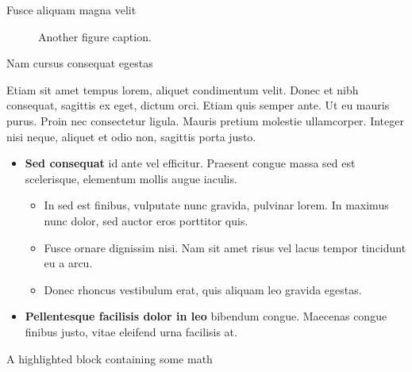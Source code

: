\documentclass[final]{beamer}
\newlength{\colwidth}
\begin{document}
\begin{frame}[t]
\begin{columns}[t]
\begin{column}{\colwidth}
\begin{block}{Fusce aliquam magna velit}
    \begin{figure}
      \centering
      \caption{Another figure caption.}
    \end{figure}

  \end{block}

  \begin{block}{Nam cursus consequat egestas}

    Etiam sit amet tempus lorem, aliquet condimentum velit. Donec et nibh
    consequat, sagittis ex eget, dictum orci. Etiam quis semper ante. Ut eu
    mauris purus. Proin nec consectetur ligula. Mauris pretium molestie
    ullamcorper. Integer nisi neque, aliquet et odio non, sagittis porta justo.

    \begin{itemize}
      \item \textbf{Sed consequat} id ante vel efficitur. Praesent congue massa
        sed est scelerisque, elementum mollis augue iaculis.
        \begin{itemize}
          \item In sed est finibus, vulputate
            nunc gravida, pulvinar lorem. In maximus nunc dolor, sed auctor eros
            porttitor quis.
          \item Fusce ornare dignissim nisi. Nam sit amet risus vel lacus
            tempor tincidunt eu a arcu.
          \item Donec rhoncus vestibulum erat, quis aliquam leo
            gravida egestas.
        \end{itemize}
      \item \textbf{Pellentesque facilisis dolor in leo} bibendum congue.
        Maecenas congue finibus justo, vitae eleifend urna facilisis at.
    \end{itemize}

  \end{block}

  
  \begin{exampleblock}{A highlighted block containing some math}


\end{exampleblock}
\end{column}
\end{columns}
\end{frame}
\end{document}
